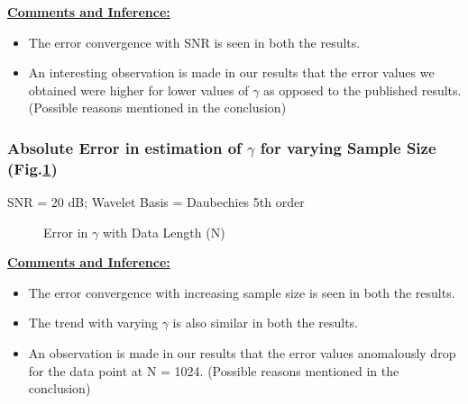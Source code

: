 \documentclass[a4paper]{article}
\begin{document}
\underline{\textbf{Comments and Inference:}}
\begin{itemize}
\item The error convergence with SNR is seen in both the results. 
\item An interesting observation is made in our results that the error values we obtained were higher for lower values of $\gamma$ as opposed to the published results. (Possible reasons mentioned in the conclusion) 
\end{itemize}

\subsubsection{Absolute Error in estimation of $\gamma$ for varying Sample Size (Fig.\ref{fig:gamma_n})}
SNR = 20 dB; Wavelet Basis = Daubechies 5th order

\begin{figure}[h!]
    \centering
   \qquad
    \caption{Error in $\gamma$ with Data Length (N)}%
    \label{fig:gamma_n}%
\end{figure}

\underline{\textbf{Comments and Inference:}}
\begin{itemize}
\item The error convergence with increasing sample size is seen in both the results.
\item The trend with varying $\gamma$ is also similar in both the results. 
\item An observation is made in our results that the error values anomalously drop for the data point at N = 1024. (Possible reasons mentioned in the conclusion) 
\end{itemize}
\end{document}
